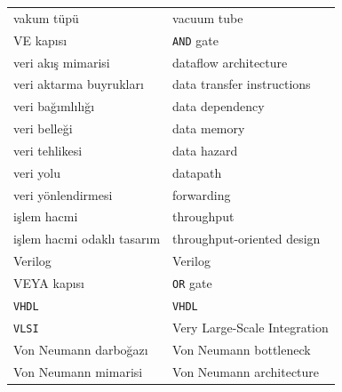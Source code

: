{\begin{longtable}{@{}p{7.6cm}p{7.6cm}@{}}
vakum tüpü & vacuum tube \\
VE kapısı & \texttt{AND} gate \\
veri akış mimarisi & dataflow architecture \\
veri aktarma buyrukları & data transfer instructions \\
veri bağımlılığı & data dependency \\
veri belleği & data memory \\
veri tehlikesi & data hazard \\
veri yolu & datapath \\
veri yönlendirmesi & forwarding \\
işlem hacmi & throughput \\
işlem hacmi odaklı tasarım & throughput-oriented design \\
Verilog & Verilog \\
VEYA kapısı & \texttt{OR} gate \\
\texttt{VHDL} & \texttt{VHDL} \\
\texttt{VLSI} & Very Large-Scale Integration \\
Von Neumann darboğazı & Von Neumann bottleneck \\
Von Neumann mimarisi & Von Neumann architecture \\


\end{longtable}}
